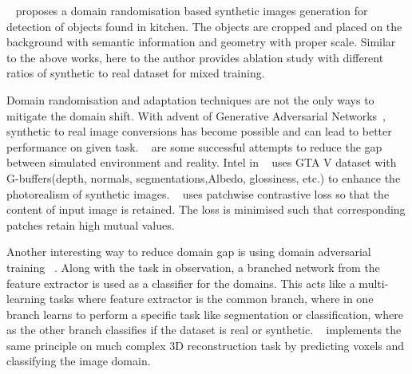 ~\cite{georgakis2017synthesizing} proposes a domain randomisation based synthetic images generation for detection of objects found in kitchen.
The objects are cropped and placed on the background with semantic information and geometry with proper scale.
Similar to the above works, here to the author provides ablation study with different ratios of synthetic to real dataset for mixed training.

Domain randomisation and adaptation techniques are not the only ways to mitigate the domain shift.
With advent of Generative Adversarial Networks~\cite{Goodfellow2014GenerativeAN}, synthetic to real image conversions has become possible and can lead to better performance on given task.
~\cite{Richter_2021, CycleGAN2017, park2020cut,isola2017image, dundar2018domain,Wang2018HighResolutionIS} are some successful attempts to reduce the gap between simulated environment and reality.
Intel in ~\cite{Richter_2021} uses GTA V dataset with G-buffers(depth, normals, segmentations,Albedo, glossiness, etc.) to enhance the photorealism of synthetic images.
~\cite{park2020cut} uses patchwise contrastive loss so that the content of input image is retained.
The loss is minimised such that corresponding patches retain high mutual values.

Another interesting way to reduce domain gap is using domain adversarial training ~\cite{ganin2016domainadversarial}.
Along with the task in observation, a branched network from the feature extractor is used as a classifier for the domains.
This acts like a multi-learning tasks where feature extractor is the common branch, where in one branch learns to perform a specific task like segmentation or classification, where as the other branch classifies if the dataset is real or synthetic.
~\cite{pinheiro2019domainadaptive} implements the same principle on much complex 3D reconstruction task by predicting voxels and classifying the image domain.

